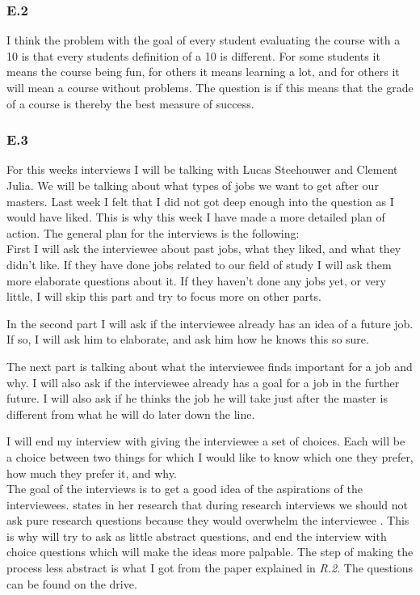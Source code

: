 \documentclass[]{article}
\begin{document}
\subsubsection*{E.2}
I think the problem with the goal of every student evaluating the course with a 
10 is that every students definition of a 10 is different. For some students it 
means the course being fun, for others it means learning a lot, and for 
others it will mean a course without problems. The question is if this means that 
the grade of a course is thereby the best measure of success.

\subsubsection*{E.3}
For this weeks interviews I will be talking with Lucas Steehouwer and Clement Julia.
We will be talking about what types of jobs we want to get after our masters.
Last week I felt that I did not got deep enough into the question as
I would have liked. This is why this week I have made a more detailed plan of action.
The general plan for the interviews is the following:\\
First I will ask the interviewee about past jobs, what they liked, 
and what they didn't like.
If they have done jobs related to our field of study I will ask them more elaborate 
questions about it. 
If they haven't done any jobs yet, or very little, I will skip this part and 
try to focus more on other parts.

In the second part I will ask if the interviewee already has an idea of a future
job. If so, I will ask him to elaborate, and ask him how he knows this so sure. 

The next part is talking about what the interviewee finds important for a job 
and why. I will also ask if the interviewee already has a goal for a job in the 
further future. I will also ask if he thinks the job he will take just after the 
master is different from what he will do later down the line. 

I will end my interview with giving the interviewee a set of choices. Each 
will be a choice between two things for which I would like to know which one they
prefer, how much they prefer it, and why.\\

The goal of the interviews is to get a good idea of the aspirations of the 
interviewees. \citeauthor[]{castillo2016preparing} states in her research that 
during research interviews we should not ask pure research questions because they
would overwhelm the interviewee \cite{castillo2016preparing}. 
This is why will try to ask as little abstract questions, 
and end the interview with choice questions which will make the ideas more palpable. 
The step of making the process less abstract is what I got from the paper 
explained in \textit{R.2}. The questions can be found on the drive.
\end{document}
